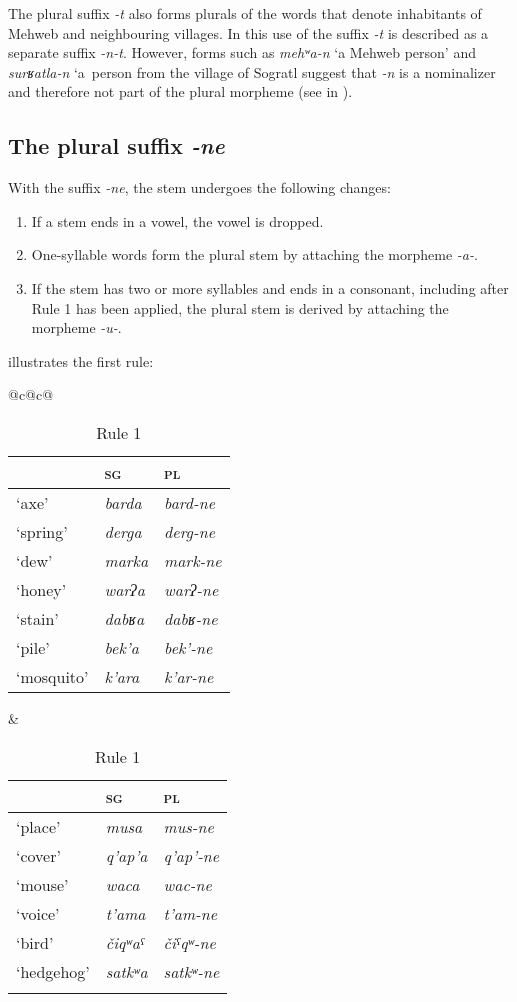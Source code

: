 ﻿\documentclass[output=paper]{langsci/langscibook}
\begin{document}
The plural suffix \emph{-t} also forms plurals of the words that denote
inhabitants of Mehweb and neighbouring villages. In \citet{magometov1982} this
use of the suffix \emph{-t} is described as a separate suffix
\emph{-n-t}. However, forms such as \emph{mehʷa-n} `a Mehweb
person' and \emph{surʁatla-n} `a~person from the village of Sogratl
suggest that \emph{-n} is a nominalizer and therefore not part of the
plural morpheme (see  in ).

\subsection{The plural suffix \emph{-ne}}
\label{the-plural-suffix--ne}

With the suffix \emph{-ne}, the stem undergoes the following changes:
\begin{enumerate}[topsep=\medskipamount,itemsep=0pt,partopsep=0pt,parsep=0pt,label={\arabic*})]
\item %
  If a stem ends in a vowel, the vowel is dropped.

\item %
  One-syllable words form the plural stem by attaching the morpheme
\emph{-a-}.

\item %
  If the stem has two or more syllables and ends in a consonant,
including after Rule 1 has been applied, the plural stem is derived by
attaching the morpheme \emph{-u-}.
\end{enumerate}

 illustrates the first rule:

\begin{table}[h]
  \caption{Rule 1}\label{tab:3:6}

  \begin{tabular}{@{}c@{\qquad}c@{}}
\toprule
    \begin{tabular}[t]{@{}lll@{}}
& \textsc{sg} & \textsc{pl}   \tabularnewline \midrule
`axe' & \emph{barda} & \emph{bard-ne}     \tabularnewline
`spring' & \emph{derga} & \emph{derg-ne}  \tabularnewline
`dew' & \emph{marka} & \emph{mark-ne}     \tabularnewline
`honey' & \emph{warʔa} & \emph{warʔ-ne}   \tabularnewline
`stain' & \emph{dabʁa} & \emph{dabʁ-ne}  \tabularnewline
`pile' & \emph{bek'a} & \emph{bek'-ne}    \tabularnewline
`mosquito' & \emph{k'ara} & \emph{k'ar-ne}\tabularnewline
\end{tabular} &
\begin{tabular}[t]{@{}lll@{}}
& \textsc{sg} & \textsc{pl}   \tabularnewline \midrule
 `place' & \emph{musa} & \emph{mus-ne}\tabularnewline
 `cover' & \emph{q'ap'a} & \emph{q'ap'-ne}\tabularnewline
 `mouse' & \emph{waca} & \emph{wac-ne}\tabularnewline
 `voice' & \emph{t'ama} & \emph{t'am-ne}\tabularnewline
 `bird' & \emph{čiqʷaˤ} & \emph{čiˤqʷ-ne}\tabularnewline
 `hedgehog' & \emph{satkʷa} & \emph{satkʷ-ne}\tabularnewline
&& \tabularnewline
\end{tabular} \tabularnewline
   \bottomrule
\end{tabular}
\end{table}
\end{document}
